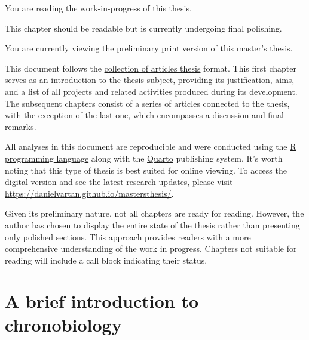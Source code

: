 \documentclass[
12pt,
openright,
oneside,
a4paper,
chapter=TITLE,
section=TITLE,
french,
spanish,
brazil,
english
]{abntex2}\usepackage{array}
\newcommand{\microskip}{\vspace{\microskipamount}}
\begin{document}
\begin{tcolorbox}[enhanced jigsaw, arc=.35mm, toprule=.15mm, opacitybacktitle=0.6, rightrule=.15mm, opacityback=0, colframe=quarto-callout-note-color-frame, titlerule=0mm, colback=white, toptitle=1mm, coltitle=black, left=2mm, colbacktitle=quarto-callout-note-color!10!white, title=\textcolor{quarto-callout-note-color}{\faInfo}\hspace{0.5em}{Note}, bottomrule=.15mm, breakable, bottomtitle=1mm, leftrule=.75mm]

You are reading the work-in-progress of this thesis.

\microskip

This chapter should be readable but is currently undergoing final
polishing.

\end{tcolorbox}

You are currently viewing the preliminary print version of this master's
thesis.

This document follows the
\href{https://en.wikipedia.org/wiki/Collection_of_articles}{collection
of articles thesis} format. This first chapter serves as an introduction
to the thesis subject, providing its justification, aims, and a list of
all projects and related activities produced during its development. The
subsequent chapters consist of a series of articles connected to the
thesis, with the exception of the last one, which encompasses a
discussion and final remarks.

All analyses in this document are reproducible and were conducted using
the \href{https://www.r-project.org/}{R programming language} along with
the \href{https://quarto.org/}{Quarto} publishing system. It's worth
noting that this type of thesis is best suited for online viewing. To
access the digital version and see the latest research updates, please
visit \url{https://danielvartan.github.io/mastersthesis/}.

Given its preliminary nature, not all chapters are ready for reading.
However, the author has chosen to display the entire state of the thesis
rather than presenting only polished sections. This approach provides
readers with a more comprehensive understanding of the work in progress.
Chapters not suitable for reading will include a call block indicating
their status.

\section{A brief introduction to
chronobiology}\label{a-brief-introduction-to-chronobiology}
\end{document}
